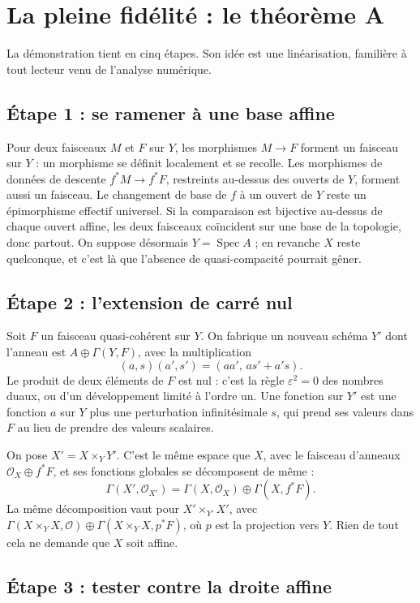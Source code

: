 \documentclass[11pt,a4paper]{amsart}
\theoremstyle{definition}
\theoremstyle{plain}
\theoremstyle{remark}
\newcommand{\Spec}{\operatorname{Spec}}
\begin{document}
\section{La pleine fidélité : le théorème A}

La démonstration tient en cinq étapes. Son idée est une linéarisation, familière à tout lecteur venu de l'analyse numérique.

\subsection{Étape 1 : se ramener à une base affine}

Pour deux faisceaux $M$ et $F$ sur $Y$, les morphismes $M\to F$ forment un faisceau sur $Y$ : un morphisme se définit localement et se recolle. Les morphismes de données de descente $f^*M\to f^*F$, restreints au-dessus des ouverts de $Y$, forment aussi un faisceau. Le changement de base de $f$ à un ouvert de $Y$ reste un épimorphisme effectif universel. Si la comparaison est bijective au-dessus de chaque ouvert affine, les deux faisceaux coïncident sur une base de la topologie, donc partout. On suppose désormais $Y=\Spec A$ ; en revanche $X$ reste quelconque, et c'est là que l'absence de quasi-compacité pourrait gêner.

\subsection{Étape 2 : l'extension de carré nul}

Soit $F$ un faisceau quasi-cohérent sur $Y$. On fabrique un nouveau schéma $Y'$ dont l'anneau est $A\oplus\Gamma(Y,F)$, avec la multiplication
\[
(a,s)(a',s')=(aa',\,as'+a's).
\]
Le produit de deux éléments de $F$ est nul : c'est la règle $\varepsilon^2=0$ des nombres duaux, ou d'un développement limité à l'ordre un. Une fonction sur $Y'$ est une fonction $a$ sur $Y$ plus une perturbation infinitésimale $s$, qui prend ses valeurs dans $F$ au lieu de prendre des valeurs scalaires.

On pose $X'=X\times_YY'$. C'est le même espace que $X$, avec le faisceau d'anneaux $\mathcal O_X\oplus f^*F$, et ses fonctions globales se décomposent de même :
\[
\Gamma(X',\mathcal O_{X'})=\Gamma(X,\mathcal O_X)\oplus\Gamma(X,f^*F).
\]
La même décomposition vaut pour $X'\times_{Y'}X'$, avec $\Gamma(X\times_YX,\mathcal O)\oplus\Gamma(X\times_YX,p^*F)$, où $p$ est la projection vers $Y$. Rien de tout cela ne demande que $X$ soit affine.

\subsection{Étape 3 : tester contre la droite affine}
\end{document}
